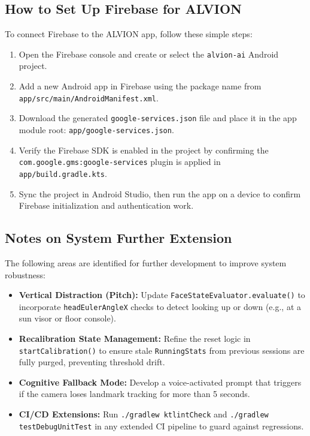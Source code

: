 \documentclass[11pt]{report}
\begin{document}
\subsection{How to Set Up Firebase for ALVION}
To connect Firebase to the ALVION app, follow these simple steps:
\begin{enumerate}
    \item Open the Firebase console and create or select the \texttt{alvion-ai} Android project.
    \item Add a new Android app in Firebase using the package name from \texttt{app/src/main/AndroidManifest.xml}.
    \item Download the generated \texttt{google-services.json} file and place it in the app module root: \texttt{app/google-services.json}.
    \item Verify the Firebase SDK is enabled in the project by confirming the \texttt{com.google.gms:google-services} plugin is applied in \texttt{app/build.gradle.kts}.
    \item Sync the project in Android Studio, then run the app on a device to confirm Firebase initialization and authentication work.
\end{enumerate}

\subsection{Notes on System Further Extension}
The following areas are identified for further development to improve system robustness:
\begin{itemize}
    \item \textbf{Vertical Distraction (Pitch):} Update \texttt{FaceStateEvaluator.evaluate()} to incorporate \texttt{headEulerAngleX} checks to detect looking up or down (e.g., at a sun visor or floor console).
    \item \textbf{Recalibration State Management:} Refine the reset logic in \texttt{startCalibration()} to ensure stale \texttt{RunningStats} from previous sessions are fully purged, preventing threshold drift.
    \item \textbf{Cognitive Fallback Mode:} Develop a voice-activated prompt that triggers if the camera loses landmark tracking for more than 5 seconds.
    \item \textbf{CI/CD Extensions:} Run \texttt{./gradlew ktlintCheck} and \texttt{./gradlew testDebugUnitTest} in any extended CI pipeline to guard against regressions.
\end{itemize}
\end{document}
